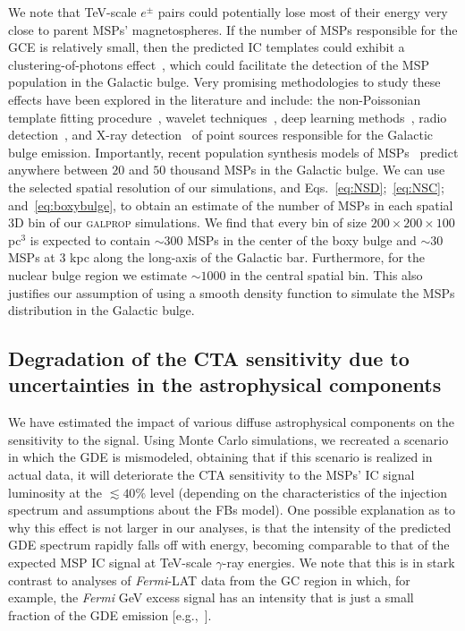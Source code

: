 \documentclass[doublespace,draft,nopageskip]{VTthesis} %
\begin{document}
We note that TeV-scale $e^{\pm}$ pairs could potentially lose most of their energy very close to parent MSPs' magnetospheres. If the number of MSPs responsible for the GCE is relatively small, then the predicted IC templates could exhibit a clustering-of-photons effect~\citep{Acharyya:2020sbj}, which could facilitate the detection of the MSP population in the Galactic bulge.  Very promising methodologies to study these effects have been explored in the literature and include: the non-Poissonian template fitting procedure~\cite{Lee:2015fea,Leane:2019xiy,Chang:2019ars,Leane:2020pfc,Leane:2020nmi,Buschmann:2020adf}, wavelet techniques~\cite{Bartels:2015aea,Balaji:2018rwz,Zhong:2019ycb}, deep learning methods~\citep{Caron:2017udl,List:2020mzd}, radio detection~\citep{Calore:2015bsx,2015ApJ...805..172M,2017MNRAS.471..730R,2019ApJ...876...20H}, and X-ray detection~\citep{Berteaud:2020zef} of point sources responsible for the Galactic bulge emission.
%
Importantly, recent population synthesis models of MSPs~\citep{Ploeg:2020jeh} predict anywhere between $20$ and $50$ thousand MSPs in the Galactic bulge. We can use the selected spatial resolution of our simulations, and Eqs.~\ref{eq:NSD};~\ref{eq:NSC}; and~\ref{eq:boxybulge}, to obtain an estimate of the number of MSPs in each spatial 3D bin of our \textsc{galprop} simulations. We find that every bin of size $200\times200\times100$ pc$^3$ is expected to contain $\sim 300$ MSPs in the center of the boxy bulge and $\sim 30$ MSPs at 3 kpc along the long-axis of the Galactic bar. Furthermore, for the nuclear bulge region we estimate $\sim 1000$ in the central spatial bin.  This also justifies our assumption of using a smooth density function to simulate the MSPs distribution in the Galactic bulge. 



\subsection{Degradation of the CTA sensitivity due to uncertainties in the astrophysical components}

 We have estimated the impact of various diffuse astrophysical components on the sensitivity to the signal. Using Monte Carlo simulations, we recreated a scenario in which the GDE is mismodeled, obtaining that if this scenario is realized in actual data, it will deteriorate the CTA sensitivity to the MSPs' IC signal luminosity at the $\lesssim 40\%$ level (depending on the characteristics of the injection spectrum and assumptions about the FBs model). 
 One possible explanation as to why this effect is not larger in our analyses, is that the intensity of the predicted GDE spectrum rapidly falls off with energy, becoming comparable to that of the expected MSP IC signal at TeV-scale $\gamma$-ray energies. We note that this is in stark contrast to analyses of \textit{Fermi}-LAT data from the GC region in which, for example, the \textit{Fermi} GeV excess signal has an intensity that is just a small fraction of the GDE emission [e.g.,~\citet{Abazajian:2020tww}].
\end{document}
